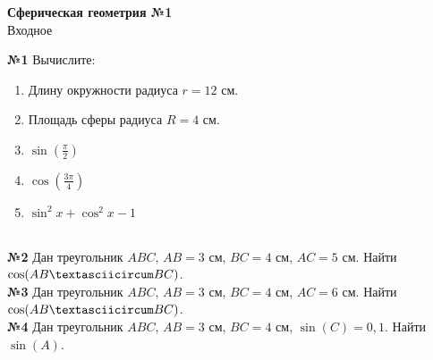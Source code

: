 


    \begin{center}
        \textbf{Сферическая геометрия №1}\\
        Входное
    \end{center}

    \textbf{№1}
    Вычислите:
    \begin{enumerate}
        \item Длину окружности радиуса $r = 12$ см.
        \item Площадь сферы радиуса $R = 4$ см.
        \item $\sin\left(\frac{\pi}{2}\right)$
        \item $\cos\left(\frac{3\pi}{4}\right)$
        \item $\sin ^ 2 x + \cos ^ 2 x - 1$
    \end{enumerate}\\


    \textbf{№2}
    Дан треугольник $ABC$, $AB = 3$ см, $BC = 4$ см, $AC = 5$ см.
    Найти $\cos(AB \textasciicircum BC)$.\\


    \textbf{№3}
    Дан треугольник $ABC$, $AB = 3$ см, $BC = 4$ см, $AC = 6$ см.
    Найти $\cos(AB \textasciicircum BC)$.\\


    \textbf{№4}
    Дан треугольник $ABC$, $AB = 3$ см, $BC = 4$ см, $\sin(C) = 0,1$.
    Найти $\sin(A)$.



